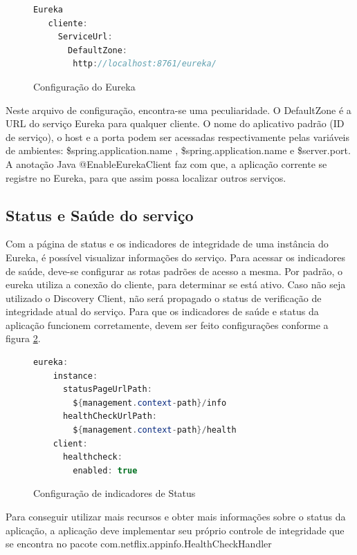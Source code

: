 \documentclass[journal]{IEEEtran}
\begin{document}
\begin{figure}[h]
\centering

\begin{lstlisting}[language=Java]
  Eureka
   cliente:
     ServiceUrl:
       DefaultZone: 
        http://localhost:8761/eureka/ 
\end{lstlisting}

\caption{Configuração do Eureka}
\label{alg:configeureka}
\end{figure}

Neste arquivo de configuração, encontra-se uma peculiaridade. O DefaultZone é a URL do serviço Eureka para qualquer cliente. O nome do aplicativo padrão (ID de serviço), o host e a porta podem ser acessadas respectivamente pelas variáveis de ambientes: \${spring.application.name} , \${spring.application.name} e \${server.port}.
A anotação Java @EnableEurekaClient faz com que, a aplicação corrente se registre no Eureka, para que assim possa localizar outros serviços.

\subsection{Status e Saúde do serviço}

Com a página de status e os indicadores de integridade de uma instância do Eureka, é possível visualizar informações do serviço. Para acessar os indicadores de saúde, deve-se configurar as rotas padrões de acesso a mesma. Por padrão, o eureka utiliza a conexão do cliente, para determinar se está ativo. Caso não seja utilizado o Discovery Client, não será propagado o status de verificação de integridade atual do serviço. Para que os indicadores de saúde e status da aplicação funcionem corretamente, devem ser feito configurações conforme a figura \ref{alg:figuratres}.

\begin{figure}[h]
\centering

\begin{lstlisting}[language=Java] 
  eureka:
    instance:
      statusPageUrlPath: 
        ${management.context-path}/info
      healthCheckUrlPath: 
        ${management.context-path}/health
    client:
      healthcheck:
        enabled: true
\end{lstlisting}

\caption{Configuração de indicadores de Status}
\label{alg:figuratres}
\end{figure}

Para conseguir utilizar mais recursos e obter mais informações sobre o status da aplicação, a aplicação deve implementar seu próprio controle de integridade que se encontra no pacote com.netflix.appinfo.HealthCheckHandler
\end{document}
